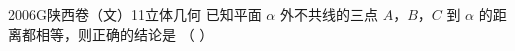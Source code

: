 
\begin{problem}{2006}{G}{陕西卷（文）}{11}{立体几何}
已知平面 $ \alpha $ 外不共线的三点 $ A $，$ B $，$ C $ 到 $ \alpha $ 的距离都相等，则正确的结论是 （ ）
\begin{choices}
\end{choices}
\end{problem}

\begin{answer}

\end{answer}

\begin{solutions}

\end{solutions}